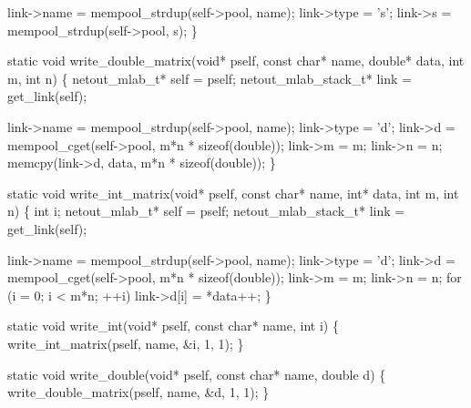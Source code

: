     link->name = mempool_strdup(self->pool, name);
    link->type = 's';
    link->s    = mempool_strdup(self->pool, s);
\}

\nwendcode{}\nwdocspar

\nwenddocs{}\plusendmoddef
static void write_double_matrix(void* pself, const char* name, double* data,
                                int m, int n)
\{
    netout_mlab_t*       self = pself;
    netout_mlab_stack_t* link = get_link(self);

    link->name = mempool_strdup(self->pool, name);
    link->type = 'd';
    link->d    = mempool_cget(self->pool, m*n * sizeof(double));
    link->m    = m;
    link->n    = n;
    memcpy(link->d, data, m*n * sizeof(double));
\}

\nwendcode{}\nwdocspar

\nwenddocs{}\plusendmoddef
static void write_int_matrix(void* pself, const char* name, int* data,
                             int m, int n)
\{
    int i;
    netout_mlab_t*       self = pself;
    netout_mlab_stack_t* link = get_link(self);

    link->name = mempool_strdup(self->pool, name);
    link->type = 'd';
    link->d    = mempool_cget(self->pool, m*n * sizeof(double));
    link->m    = m;
    link->n    = n;
    for (i = 0; i < m*n; ++i)
        link->d[i] = *data++;
\}

\nwendcode{}\nwdocspar

\nwenddocs{}\plusendmoddef
static void write_int(void* pself, const char* name, int i)
\{
    write_int_matrix(pself, name, &i, 1, 1);
\}

\nwendcode{}\nwdocspar

\nwenddocs{}\plusendmoddef
static void write_double(void* pself, const char* name, double d)
\{
    write_double_matrix(pself, name, &d, 1, 1);
\}

